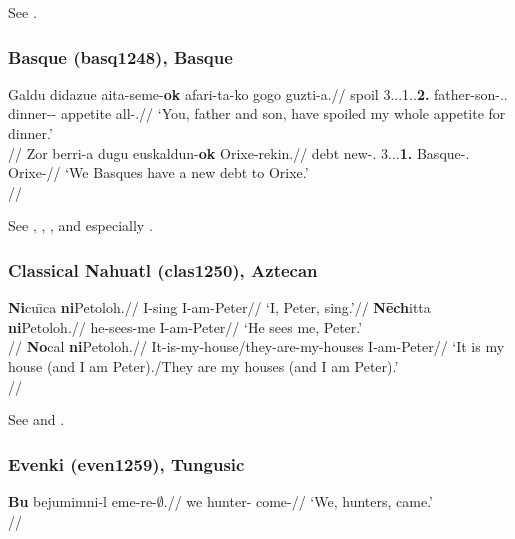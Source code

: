 See \citet[157, 159]{hewitt1989}.

\subsubsection{Basque (basq1248), Basque}

\pex
\a
\begingl
\gla Galdu didazue aita-seme-\textbf{ok} afari-ta-ko gogo guzti-a.//
\glb spoil 3\Sg{}.\Abs{}.\Aux{}.1\Sg{}.\Dat{}.\textbf{2\Pl{}.\Erg} father-son-\Proxart.\Pl{}.\Erg{} dinner-\Loc{}-\Lnk{} appetite all-\Det{}.\Abs{}//
\glft `{You, father and son}, have spoiled my whole appetite for dinner.' \\{\citep[502, (90a)]{derijk2008}}//
\endgl 
\a
\begingl
\gla Zor berri-a dugu euskaldun-\textbf{ok} Orixe-rekin.//
\glb debt new-\Det{}.\Abs{}{} 3\Sg{}.\Abs{}.\Aux{}.\textbf{1\Pl{}.\Erg} Basque-\Proxart.\Pl{}{} Orixe-\Com{}//
\glft `{We Basques} have a new debt to Orixe.' \\{\citep[502, (91a)]{derijk2008}}//
\endgl
\xe

See \citet[210]{saltarelli1988}, \citet[122]{trask2003}, \citet[482, 501f.]{derijk2008}, \citet[67]{areta2009} and especially \citet{artiagoitia2012DP}.

\subsubsection{Classical Nahuatl (clas1250), Aztecan}

\pex
\a
\begingl
\gla \textbf{Ni}cu\={\i}ca \textbf{ni}Petoloh.//
\glb I-sing I-am-Peter//
\glft `I, Peter, sing.'//
\endgl
\a
\begingl
\gla \textbf{N\={e}ch}itta \textbf{ni}Petoloh.//
\glb he-sees-me I-am-Peter//
\glft `He sees me, Peter.'\\{\citep[193]{andrews1975}}//
\endgl
\a
\begingl
\gla \textbf{No}cal \textbf{ni}Petoloh.//
\glb It-is-my-house/they-are-my-houses I-am-Peter//
\glft `It is my house (and I am Peter)./They are my houses (and I am Peter).'\\{\citep[194]{andrews1975}}//
\endgl
\xe

See \citet[192--194]{andrews1975} and \citealp[ch. 17.3]{andrews2003}.

\subsubsection{Evenki (even1259), Tungusic}

\ex \begingl
\gla  \textbf{Bu} bejumimni-l eme-re-$\emptyset$.//
\glb we hunter-\Pl{} come-\Pl//
\glft `We, hunters, came.' \\\citep[199, (794)]{nedjalkov1997}//
\endgl
\xe

